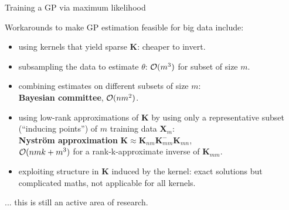 \begin{vbframe}{Training a GP via maximum likelihood}
\framebreak 

Workarounds to make GP estimation feasible for big data include:
\begin{itemize}
\item using kernels that yield sparse $\bm K$: cheaper to invert.
\item subsampling the data to estimate $\theta$: $\mathcal{O}(m^3)$ for subset of size $m$.
\item combining estimates on different subsets of size $m$:\\ \textbf{Bayesian committee}, $\mathcal{O}(n m^2)$.
\item using low-rank approximations of $\bm{K}$ by using only a representative subset (\enquote{inducing points}) of $m$ training data $\bm X_m$:\\ \textbf{Nyström approximation} $\bm K \approx \bm K_{nm} \bm K_{mm}^{-} \bm K_{mn}$,\\ $\mathcal{O}(nmk + m^3)$ for a rank-k-approximate inverse of $\bm K_{mm}$.
\item exploiting structure in $\bm{K}$ induced by the kernel: exact solutions but complicated maths, not  applicable for all kernels.
\end{itemize}

... this is still an active area of research.

\end{vbframe}

% 
% 
% 
% 
% 
% 

\endlecture

